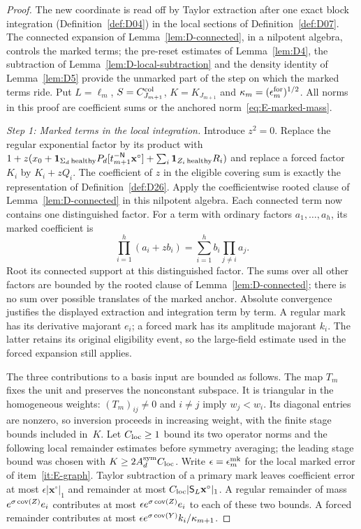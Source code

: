 \begin{proof}
The new coordinate is read off by Taylor extraction after one exact block integration (Definition~\ref{def:D04}) in the local sections of Definition~\ref{def:D07}. The connected expansion of Lemma~\ref{lem:D-connected}, in a nilpotent algebra, controls the marked terms; the pre-reset estimates of Lemma~\ref{lem:D4}, the subtraction of Lemma~\ref{lem:D-local-subtraction} and the density identity of Lemma~\ref{lem:D5} provide the unmarked part of the step on which the marked terms ride. Put $L=\ell_m$, $S=C^{\rm col}_{J_{m+1}}$, $K=K_{J_{m+1}}$ and $\kappa_m=(\epsilon_m^{\rm for})^{1/2}$. All norms in this proof are coefficient sums or the anchored norm~\eqref{eq:E-marked-mass}.

\emph{Step 1: Marked terms in the local integration.}
Introduce $z^2=0$. Replace the regular exponential factor by its product with
$1+z(x_0+\mathbf1_{\Sigma_d\,\mathrm{healthy}}P_d[t_{m+1}^{-\mathsf{N}}\mathbf x^\circ]+\sum_i\mathbf1_{Z_i\,\mathrm{healthy}}R_i)$ and replace a forced factor $K_i$ by $K_i+zQ_i$. The coefficient of $z$ in the eligible covering sum is exactly the representation of Definition~\ref{def:D26}. Apply the coefficientwise rooted clause of Lemma~\ref{lem:D-connected} in this nilpotent algebra. Each connected term now contains one distinguished factor. For a term with ordinary factors $a_1,\ldots,a_h$, its marked coefficient is
\begin{equation*}
 [z]\prod_{i=1}^h(a_i+zb_i)
 =\sum_{i=1}^h b_i\prod_{j\ne i}a_j.
\end{equation*}
Root its connected support at this distinguished factor. The sums over all other factors are bounded by the rooted clause of Lemma~\ref{lem:D-connected}; there is no sum over possible translates of the marked anchor. Absolute convergence justifies the displayed extraction and integration term by term. A regular mark has its derivative majorant $e_i$; a forced mark has its amplitude majorant $k_i$. The latter retains its original eligibility event, so the large-field estimate used in the forced expansion still applies.

The three contributions to a basis input are bounded as follows. The map $T_m$ fixes the unit and preserves the nonconstant subspace. It is triangular in the homogeneous weights: $(T_m)_{ij}\ne0$ and $i\ne j$ imply $w_j<w_i$. Its diagonal entries are nonzero, so inversion proceeds in increasing weight, with the finite stage bounds included in~$K$. Let $C_{\rm loc}\ge1$ bound its two operator norms and the following local remainder estimates before symmetry averaging; the leading stage bound was chosen with $K\ge2A_d^{\rm sym}C_{\rm loc}$. Write $\epsilon=\epsilon^{\rm mk}_m$ for the local marked error of item~\ref{it:E-graph}. Taylor subtraction of a primary mark leaves coefficient error at most $\epsilon|\mathbf x^\circ|_1$ and remainder at most $C_{\rm loc}|\mathsf S_L\mathbf x^\circ|_1$. A regular remainder of mass $e^{\sigma\operatorname{cov}(Z)}e_i$ contributes at most $\epsilon e^{\sigma\operatorname{cov}(Z)}e_i$ to each of these two bounds. A forced remainder contributes at most $\epsilon e^{\sigma\operatorname{cov}(Y)}k_i/\kappa_{m+1}$.


\end{proof}
